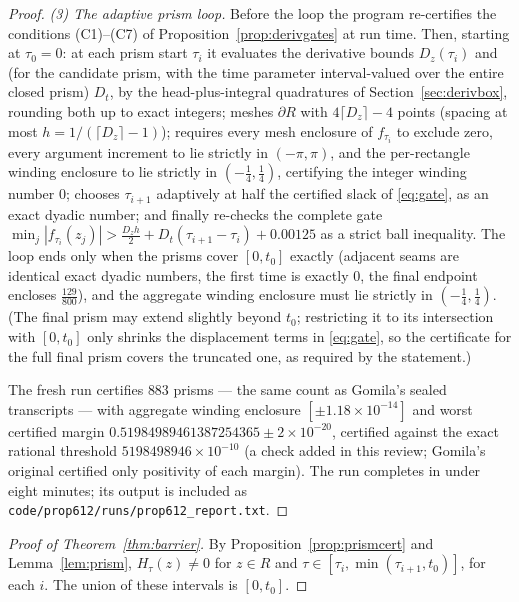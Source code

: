 \documentclass[11pt]{article}
\theoremstyle{definition}
\begin{document}
\begin{proof}
\emph{(3) The adaptive prism loop.} Before the loop the program
re-certifies the conditions (C1)--(C7) of
Proposition~\ref{prop:derivgates} at run time. Then, starting at
$\tau_0=0$: at each prism start $\tau_i$ it evaluates the
derivative bounds $D_z(\tau_i)$ and (for the candidate prism, with
the time parameter interval-valued over the entire closed prism)
$D_t$, by the head-plus-integral quadratures of
Section~\ref{sec:derivbox}, rounding both up to exact integers;
meshes $\partial R$ with $4\lceil D_z\rceil-4$ points (spacing at
most $h=1/(\lceil D_z\rceil-1)$); requires every mesh enclosure of
$f_{\tau_i}$ to exclude zero, every argument increment to lie
strictly in $(-\pi,\pi)$, and the per-rectangle winding enclosure
to lie strictly in $(-\frac14,\frac14)$, certifying the integer
winding number $0$; chooses $\tau_{i+1}$ adaptively at half the
certified slack of \eqref{eq:gate}, as an exact dyadic number; and
finally re-checks the complete gate
$\min_j|f_{\tau_i}(z_j)|>\frac{D_zh}2+D_t(\tau_{i+1}-\tau_i)
+0.00125$ as a strict ball inequality. The loop ends only when the
prisms cover $[0,t_0]$ exactly (adjacent seams are identical exact
dyadic numbers, the first time is exactly $0$, the final endpoint
encloses $\frac{129}{800}$), and the aggregate winding enclosure
must lie strictly in $(-\frac14,\frac14)$. (The final prism may
extend slightly beyond $t_0$; restricting it to its intersection
with $[0,t_0]$ only shrinks the displacement terms in
\eqref{eq:gate}, so the certificate for the full final prism covers
the truncated one, as required by the statement.)

The fresh run certifies $883$ prisms --- the same count as
Gomila's sealed transcripts --- with aggregate winding enclosure
$[\pm1.18\times10^{-14}]$ and worst certified margin
$0.51984989461387254365\pm2\times10^{-20}$, certified against the
exact rational threshold $5198498946\times10^{-10}$ (a check added
in this review; Gomila's original certified only positivity of each
margin). The run completes in under eight minutes; its output is
included as \texttt{code/prop612/runs/prop612\_report.txt}.
\end{proof}

\begin{proof}[Proof of Theorem~\ref{thm:barrier}]
By Proposition~\ref{prop:prismcert} and Lemma~\ref{lem:prism},
$H_\tau(z)\neq0$ for $z\in R$ and
$\tau\in[\tau_i,\min(\tau_{i+1},t_0)]$, for each $i$. The union of
these intervals is $[0,t_0]$.
\end{proof}
\end{document}
